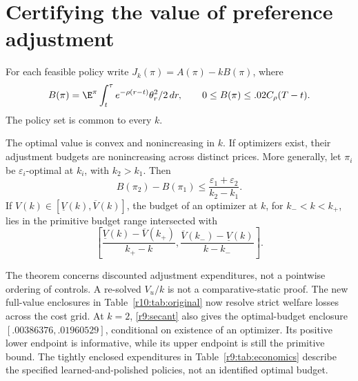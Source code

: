 \section{Certifying the value of preference adjustment}\label{r9:economics}
For each feasible policy write $J_k(\pi)=A(\pi)-kB(\pi)$, where
\[
 B(\pi)=\E^\pi\int_t^\tau e^{-\rho(r-t)}\theta_r^2/2\,dr,
 \qquad 0\leq B(\pi)\leq .02C_\rho(T-t).
\]
The policy set is common to every $k$.
\begin{theorem}\label{r9:cost}
The optimal value is convex and nonincreasing in $k$. If optimizers exist, their adjustment budgets are nonincreasing across distinct prices. More generally, let $\pi_i$ be $\varepsilon_i$-optimal at $k_i$, with $k_2>k_1$. Then
\begin{equation}
 B(\pi_2)-B(\pi_1)\leq\frac{\varepsilon_1+\varepsilon_2}{k_2-k_1}.\label{r9:reversal}
\end{equation}
If $V(k)\in[\underline V(k),\overline V(k)]$, the budget of an optimizer at $k$, for $k_-<k<k_+$, lies in the primitive budget range intersected with
\begin{equation}
 \left[\frac{\underline V(k)-\overline V(k_+)}{k_+-k},
       \frac{\overline V(k_-)-\underline V(k)}{k-k_-}\right].\label{r9:secant}
\end{equation}
\end{theorem}
The theorem concerns discounted adjustment expenditures, not a pointwise ordering of controls. A re-solved $V_u/k$ is not a comparative-static proof. The new full-value enclosures in Table~\ref{r10:tab:original} now resolve strict welfare losses across the cost grid. At $k=2$, \eqref{r9:secant} also gives the optimal-budget enclosure $[.00386376,.01960529]$, conditional on existence of an optimizer. Its positive lower endpoint is informative, while its upper endpoint is still the primitive bound. The tightly enclosed expenditures in Table~\ref{r9:tab:economics} describe the specified learned-and-polished policies, not an identified optimal budget.

